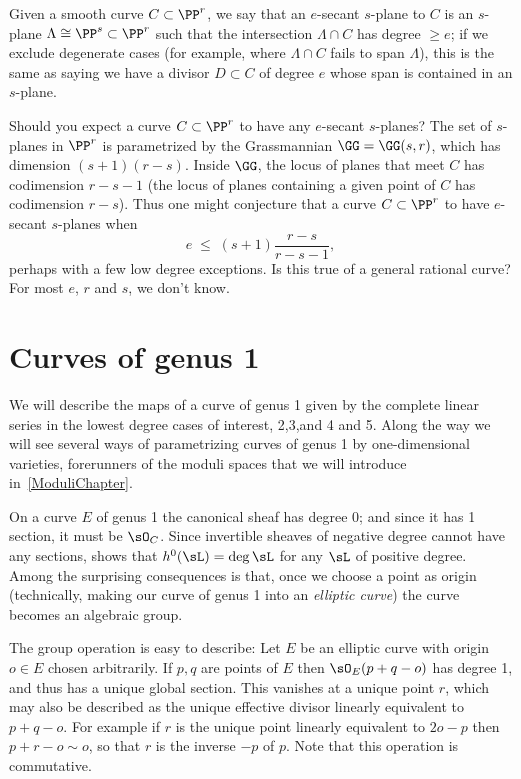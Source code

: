 Given a smooth curve $C \subset \PP^r$, we say that an $e$-secant $s$-plane to $C$ is an $s$-plane $\Lambda \cong \PP^s \subset \PP^r$ such that the intersection $\Lambda \cap C$ has degree $\geq e$; if we exclude degenerate cases (for example, where $\Lambda \cap C$ fails to span $\Lambda$), this is the same as saying we have a divisor $D \subset C$ of degree $e$ whose span is contained in an $s$-plane.

Should you expect a curve $C \subset \PP^r$ to have any $e$-secant $s$-planes? The set of $s$-planes in $\PP^r$ is parametrized by the Grassmannian $\GG = \GG(s,r)$, which has dimension $(s+1)(r-s)$. Inside $\GG$, the locus of planes that meet $C$ has codimension $r-s-1$ (the locus of planes containing a given point of $C$ has codimension $r-s$). Thus one might conjecture that a curve $C \subset \PP^r$ to have $e$-secant $s$-planes when 
$$
e \; \leq \; (s+1)\frac{r-s}{r-s-1},
$$
perhaps with a few low degree exceptions. Is this true of a general rational curve? For most $e$, $r$ and $s$, we don't know.

\section{Curves of genus 1}

We will describe the maps of a curve of genus 1 given by
the complete linear series in the lowest degree cases of interest, 2,3,and 4 and 5. Along the
way we will see several ways of parametrizing curves of genus 1 by one-dimensional varieties,
forerunners of the moduli spaces that we will introduce in~\ref{ModuliChapter}.


On a curve $E$ of genus 1 the canonical sheaf has degree 0; and since it has 1 section, it must be $\sO_C$.
Since invertible sheaves of negative degree cannot have any sections, \trr shows that
$h^0( \sL) = \deg \sL$ for any $\sL$ of positive degree. Among the surprising consequences is that, once we choose a point as 
origin (technically, making our curve of genus 1 into an \emph{elliptic curve}) the curve becomes
an algebraic group. 

The group operation is easy to describe:
Let $E$ be an elliptic curve with origin $o\in E$ chosen arbitrarily. If $p,q$ are points of $E$ then $\sO_E(p+q-o)$ has degree 1, and
thus has a unique global section. This vanishes at a unique point $r$, which may also be described as the unique
effective divisor linearly equivalent to $p+q-o$. For example if $r$ is the  unique point
linearly equivalent to $2o-p$ then $p+r-o\sim o$, so that $r$ is the inverse $-p$ of $p$. Note that this operation is commutative.

